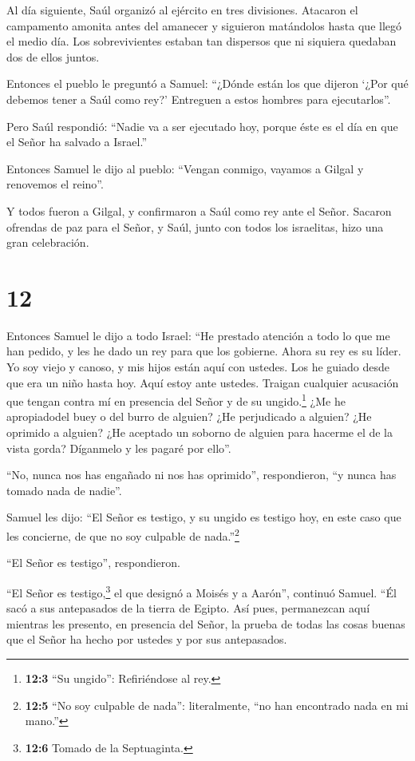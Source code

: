  Al día siguiente, Saúl organizó al ejército en tres
divisiones. Atacaron el campamento amonita antes del amanecer y
siguieron matándolos hasta que llegó el medio día. Los sobrevivientes
estaban tan dispersos que ni siquiera quedaban dos de ellos juntos.

 Entonces el pueblo le preguntó a Samuel: ``¿Dónde están
los que dijeron `¿Por qué debemos tener a Saúl como rey?' Entreguen a
estos hombres para ejecutarlos''.

 Pero Saúl respondió: ``Nadie va a ser ejecutado hoy,
porque éste es el día en que el Señor ha salvado a Israel.''

 Entonces Samuel le dijo al pueblo: ``Vengan conmigo,
vayamos a Gilgal y renovemos el reino''.

 Y todos fueron a Gilgal, y confirmaron a Saúl como rey
ante el Señor. Sacaron ofrendas de paz para el Señor, y Saúl, junto con
todos los israelitas, hizo una gran celebración.

\hypertarget{section-11}{%
\section{12}\label{section-11}}

 Entonces Samuel le dijo a todo Israel: ``He prestado
atención a todo lo que me han pedido, y les he dado un rey para que los
gobierne.  Ahora su rey es su líder. Yo soy viejo y canoso,
y mis hijos están aquí con ustedes. Los he guiado desde que era un niño
hasta hoy.  Aquí estoy ante ustedes. Traigan cualquier
acusación que tengan contra mí en presencia del Señor y de su
ungido.\footnote{\textbf{12:3} ``Su ungido'': Refiriéndose al rey.} ¿Me
he apropiadodel buey o del burro de alguien? ¿He perjudicado a alguien?
¿He oprimido a alguien? ¿He aceptado un soborno de alguien para hacerme
el de la vista gorda? Díganmelo y les pagaré por ello''.

 ``No, nunca nos has engañado ni nos has oprimido'',
respondieron, ``y nunca has tomado nada de nadie''.

 Samuel les dijo: ``El Señor es testigo, y su ungido es
testigo hoy, en este caso que les concierne, de que no soy culpable de
nada.''\footnote{\textbf{12:5} ``No soy culpable de nada'':
  literalmente, ``no han encontrado nada en mi mano.''}

``El Señor es testigo'', respondieron.

 ``El Señor es testigo,\footnote{\textbf{12:6} Tomado de la
  Septuaginta.} el que designó a Moisés y a Aarón'', continuó Samuel.
``Él sacó a sus antepasados de la tierra de Egipto.  Así
pues, permanezcan aquí mientras les presento, en presencia del Señor, la
prueba de todas las cosas buenas que el Señor ha hecho por ustedes y por
sus antepasados.

